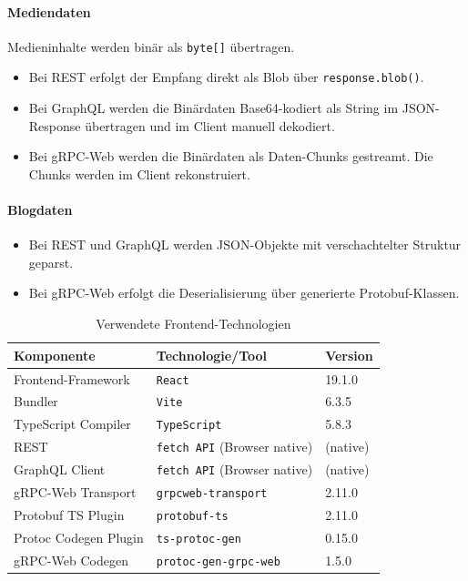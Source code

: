 \begin{enumerate}
	\paragraph{Mediendaten}
	Medieninhalte werden binär als \texttt{byte[]} übertragen.
	\begin{itemize}
		\item Bei REST erfolgt der Empfang direkt als Blob über \texttt{response.blob()}.
		\item Bei GraphQL werden die Binärdaten Base64-kodiert als String im JSON-Response übertragen und im Client manuell dekodiert.
		\item Bei gRPC-Web werden die Binärdaten als Daten-Chunks gestreamt. Die Chunks werden im Client rekonstruiert.
	\end{itemize}
	
	\paragraph{Blogdaten}
	\begin{itemize}
		\item Bei REST und GraphQL werden JSON-Objekte mit verschachtelter Struktur geparst.
		\item Bei gRPC-Web erfolgt die Deserialisierung über generierte Protobuf-Klassen.
	\end{itemize}
	
	\begin{table}[h]
		\centering
		\caption{Verwendete Frontend-Technologien}
		\begin{tabular}{lll}
			\hline
			\textbf{Komponente} & \textbf{Technologie/Tool} & \textbf{Version} \\
			\hline
			Frontend-Framework & \texttt{React} & 19.1.0 \\
			Bundler & \texttt{Vite} & 6.3.5 \\
			TypeScript Compiler & \texttt{TypeScript} & 5.8.3 \\
			REST & \texttt{fetch API} (Browser native) & (native) \\
			GraphQL Client & \texttt{fetch API} (Browser native) & (native) \\
			gRPC-Web Transport & \texttt{grpcweb-transport} & 2.11.0 \\
			Protobuf TS Plugin & \texttt{protobuf-ts} & 2.11.0 \\
			Protoc Codegen Plugin & \texttt{ts-protoc-gen} & 0.15.0 \\
			gRPC-Web Codegen & \texttt{protoc-gen-grpc-web} & 1.5.0 \\
			\hline
		\end{tabular}
	\end{table}
	

\end{enumerate}

